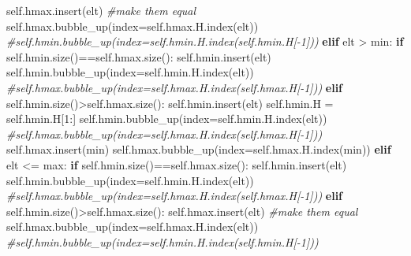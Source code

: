 \documentclass[
]{article}
\newenvironment{Shaded}{}{}
\newcommand{\BuiltInTok}[1]{\textcolor[rgb]{0.00,0.50,0.00}{#1}}
\newcommand{\CommentTok}[1]{\textcolor[rgb]{0.38,0.63,0.69}{\textit{#1}}}
\newcommand{\ControlFlowTok}[1]{\textcolor[rgb]{0.00,0.44,0.13}{\textbf{#1}}}
\newcommand{\DecValTok}[1]{\textcolor[rgb]{0.25,0.63,0.44}{#1}}
\newcommand{\NormalTok}[1]{#1}
\newcommand{\OperatorTok}[1]{\textcolor[rgb]{0.40,0.40,0.40}{#1}}
\newcommand{\VariableTok}[1]{\textcolor[rgb]{0.10,0.09,0.49}{#1}}
\begin{document}
\begin{Shaded}
\begin{Highlighting}[]
            \VariableTok{self}\NormalTok{.hmax.insert(elt) }\CommentTok{\#make them equal}
            \VariableTok{self}\NormalTok{.hmax.bubble\_up(index}\OperatorTok{=}\VariableTok{self}\NormalTok{.hmax.H.index(elt))}
            \CommentTok{\#self.hmin.bubble\_up(index=self.hmin.H.index(self.hmin.H[{-}1]))}
        \ControlFlowTok{elif}\NormalTok{ elt }\OperatorTok{\textgreater{}} \BuiltInTok{min}\NormalTok{:}
          \ControlFlowTok{if} \VariableTok{self}\NormalTok{.hmin.size()}\OperatorTok{==}\VariableTok{self}\NormalTok{.hmax.size():}
            \VariableTok{self}\NormalTok{.hmin.insert(elt)}
            \VariableTok{self}\NormalTok{.hmin.bubble\_up(index}\OperatorTok{=}\VariableTok{self}\NormalTok{.hmin.H.index(elt))}
            \CommentTok{\#self.hmax.bubble\_up(index=self.hmax.H.index(self.hmax.H[{-}1]))}
          \ControlFlowTok{elif} \VariableTok{self}\NormalTok{.hmin.size()}\OperatorTok{\textgreater{}}\VariableTok{self}\NormalTok{.hmax.size():}
            \VariableTok{self}\NormalTok{.hmin.insert(elt)}
            \VariableTok{self}\NormalTok{.hmin.H }\OperatorTok{=} \VariableTok{self}\NormalTok{.hmin.H[}\DecValTok{1}\NormalTok{:]}
            \VariableTok{self}\NormalTok{.hmin.bubble\_up(index}\OperatorTok{=}\VariableTok{self}\NormalTok{.hmin.H.index(elt))}
            \CommentTok{\#self.hmax.bubble\_up(index=self.hmax.H.index(self.hmax.H[{-}1]))}
            \VariableTok{self}\NormalTok{.hmax.insert(}\BuiltInTok{min}\NormalTok{)}
            \VariableTok{self}\NormalTok{.hmax.bubble\_up(index}\OperatorTok{=}\VariableTok{self}\NormalTok{.hmax.H.index(}\BuiltInTok{min}\NormalTok{))}
        \ControlFlowTok{elif}\NormalTok{ elt }\OperatorTok{\textless{}=} \BuiltInTok{max}\NormalTok{:}
          \ControlFlowTok{if} \VariableTok{self}\NormalTok{.hmin.size()}\OperatorTok{==}\VariableTok{self}\NormalTok{.hmax.size():}
            \VariableTok{self}\NormalTok{.hmin.insert(elt)}
            \VariableTok{self}\NormalTok{.hmin.bubble\_up(index}\OperatorTok{=}\VariableTok{self}\NormalTok{.hmin.H.index(elt))}
            \CommentTok{\#self.hmax.bubble\_up(index=self.hmax.H.index(self.hmax.H[{-}1]))}
          \ControlFlowTok{elif} \VariableTok{self}\NormalTok{.hmin.size()}\OperatorTok{\textgreater{}}\VariableTok{self}\NormalTok{.hmax.size():}
            \VariableTok{self}\NormalTok{.hmax.insert(elt) }\CommentTok{\#make them equal}
            \VariableTok{self}\NormalTok{.hmax.bubble\_up(index}\OperatorTok{=}\VariableTok{self}\NormalTok{.hmax.H.index(elt))}
            \CommentTok{\#self.hmin.bubble\_up(index=self.hmin.H.index(self.hmin.H[{-}1]))}





\end{Highlighting}
\end{Shaded}
\end{document}
